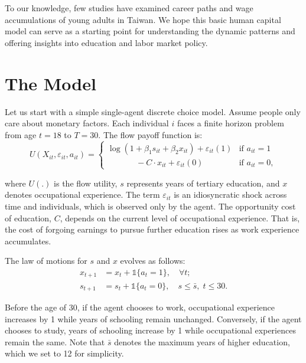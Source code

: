 \documentclass[a4paper, 12pt]{article}
\begin{document}
To our knowledge, few studies have examined career paths and wage accumulations of young adults in Taiwan.
We hope this basic human capital model can serve as a starting point for understanding the dynamic patterns and offering insights into education and labor market policy.

\section{The Model}

Let us start with a simple single-agent discrete choice model. Assume people only care about monetary factors. 
Each individual $i$ faces a finite horizon problem from age $t=18$ to $T=30$. The flow payoff function is:
\begin{equation}
U(X_{it},\varepsilon_{it}, a_{it}) =
\begin{cases}
    \log \left(1+\beta_1 s_{it} + \beta_2 x_{it}\right) + \varepsilon_{it}(1) & \text{if } a_{it} = 1 \\
    \qquad \quad\;\, -C\cdot x_{it} + \varepsilon_{it}(0) & \text{if } a_{it} = 0,
\end{cases}
\end{equation}

where \(U(.)\) is the flow utility, 
$s$ represents years of tertiary education, and $x$ denotes occupational experience.
The term $\varepsilon_{it}$ is an idiosyncratic shock across time and individuals, which is observed only by the agent.
The opportunity cost of education, $C$, depends on the current level of occupational experience.
That is, the cost of forgoing earnings to pursue further education rises as work experience accumulates.


The law of motions for $s$ and $x$ evolves as follows: 
\begin{equation}
\begin{split}
x_{t+1} &= x_t + \mathds{1}{\{a_t=1\}}, \quad \forall t; \\
s_{t+1} &= s_t + \mathds{1}{\{a_t=0\}},\quad s \leq \bar{s},\;t\leq 30.
\end{split}
\label{law_of_motion}
\end{equation}

Before the age of 30, if the agent chooses to work, occupational experience increases by 1 while years of schooling remain unchanged. Conversely, if the agent chooses to study, years of schooling increase by 1 while occupational experiences remain the same.
Note that \(\bar{s}\) denotes the maximum years of higher education, which we set to 12 for simplicity.
\end{document}

